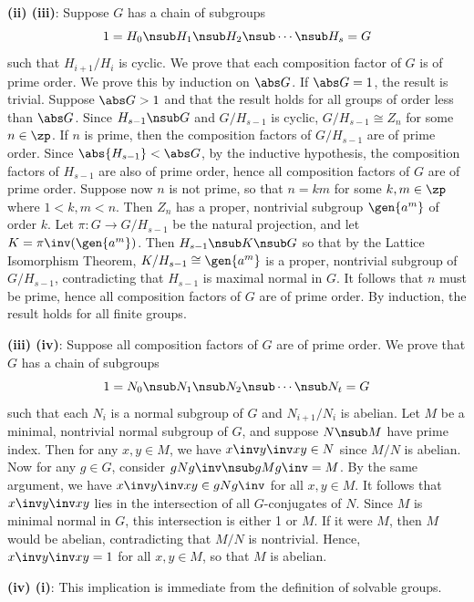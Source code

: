 \begin{sol}
    \textbf{(ii) \rightimp (iii)}: Suppose $G$ has a chain of subgroups
    \[
    	1 = H_0 \nsub H_1 \nsub H_2 \nsub \cdots \nsub H_s = G
    \]
    such that $H_{i + 1}/H_i$ is cyclic.
	We prove that each composition factor of $G$ is of prime order.
	We prove this by induction on $\abs G$.
	If $\abs G = 1$, the result is trivial.
	Suppose $\abs G > 1$ and that the result holds for all groups of order less than $\abs G$.
	Since $H_{s - 1} \nsub G$ and $G/H_{s - 1}$ is cyclic, $G/H_{s - 1} \cong Z_n$ for some $n \in \zp$.
	If $n$ is prime, then the composition factors of $G/H_{s - 1}$ are of prime order.
	Since $\abs{H_{s - 1}} < \abs G$, by the inductive hypothesis, the composition factors of $H_{s - 1}$ are also of prime order, hence all composition factors of $G$ are of prime order.
	Suppose now $n$ is not prime, so that $n = km$ for some $k, m \in \zp$ where $1 < k, m < n$.
	Then $Z_n$ has a proper, nontrivial subgroup $\gen{a^m}$ of order $k$.
	Let $\pi \colon G \to G/H_{s - 1}$ be the natural projection, and let $K = \pi\inv(\gen{a^m})$.
	Then $H_{s - 1} \nsub K \nsub G$ so that by the Lattice Isomorphism Theorem, $K/H_{s - 1} \cong \gen{a^m}$ is a proper, nontrivial subgroup of $G/H_{s - 1}$, contradicting that $H_{s - 1}$ is maximal normal in $G$.
	It follows that $n$ must be prime, hence all composition factors of $G$ are of prime order.
	By induction, the result holds for all finite groups.

    \textbf{(iii) \rightimp (iv)}: Suppose all composition factors of $G$ are of prime order.
	We prove that $G$ has a chain of subgroups
    \[
    	1 = N_0 \nsub N_1 \nsub N_2 \nsub \cdots \nsub N_t = G
    \]
    such that each $N_i$ is a normal subgroup of $G$ and $N_{i + 1}/N_i$ is abelian.
	Let $M$ be a minimal, nontrivial normal subgroup of $G$, and suppose $N \nsub M$ have prime index.
	Then for any $x, y \in M$, we have $x\inv y\inv xy \in N$ since $M/N$ is abelian.
	Now for any $g \in G$, consider $gNg\inv \nsub gMg\inv = M$.
	By the same argument, we have $x\inv y\inv xy \in gNg\inv$ for all $x, y \in M$.
	It follows that $x\inv y\inv xy$ lies in the intersection of all $G$-conjugates of $N$.
	Since $M$ is minimal normal in $G$, this intersection is either 1 or $M$.
	If it were $M$, then $M$ would be abelian, contradicting that $M/N$ is nontrivial.
	Hence, $x\inv y\inv xy = 1$ for all $x, y \in M$, so that $M$ is abelian.

    \textbf{(iv) \rightimp (i)}: This implication is immediate from the definition of solvable groups.
\end{sol}

